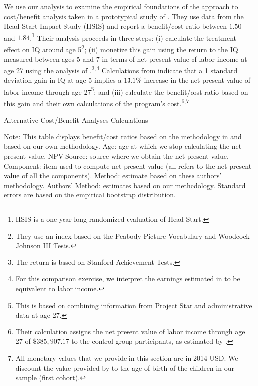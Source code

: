 We use our analysis to examine the empirical foundations of the approach to cost/benefit analysis taken in a prototypical study of \citet{Kline_Walters_2016_QJE}. They use data from the Head Start Impact Study (HSIS) and report a benefit/cost ratio between $1.50$ and $1.84$.\footnote{HSIS is a one-year-long randomized evaluation of Head Start.} Their analysis proceeds in three steps: (i) calculate the treatment effect on IQ around age 5\footnote{They use an index based on the Peabody Picture Vocabulary and Woodcock Johnson III Tests.}; (ii) monetize this gain using the return to the IQ measured between ages 5 and 7 in terms of net present value of labor income at age 27 using the analysis of \citet{Chetty_Friedman_etal_2011_QJoE}.\footnote{The \citet{Chetty_Friedman_etal_2011_QJoE} return is based on Stanford Achievement Tests.}$^,$\footnote{For this comparison exercise, we interpret the earnings estimated in \citet{Chetty_Friedman_etal_2011_QJoE} to be equivalent to labor income.} Calculations from \citet{Chetty_Friedman_etal_2011_QJoE} indicate that a 1 standard deviation gain in IQ at age 5 implies a $13.1\%$ increase in the net present value of labor income through age 27\footnote{This is based on combining information from Project Star and administrative data at age 27.}; and (iii) calculate the benefit/cost ratio based on this gain and their own calculations of the program's cost.\footnote{Their calculation assigns the net present value of labor income through age 27 of $\$385,907.17$ to the control-group participants, as estimated by  \citet{Chetty_Friedman_etal_2011_QJoE}.}$^,$\footnote{All monetary values that we provide in this section are in 2014 USD. We discount the value provided by \citet{Chetty_Friedman_etal_2011_QJoE} to the age of birth of the children in our sample (first cohort).}

\begin{table}[!htbp]
\begin{threeparttable}
\caption{Alternative Cost/Benefit Analyses Calculations}
\label{table:comparing}
\centering
\footnotesize

\begin{tablenotes}
\footnotesize
\item Note: This table displays benefit/cost ratios based on the methodology in \citet{Kline_Walters_2016_QJE} and based on our own methodology. Age: age at which we stop calculating the net present value. NPV Source: source where we obtain the net present value. Component: item used to compute net present value (all refers to the net present value of all the components). \citet{Kline_Walters_2016_QJE} Method: estimate based on these authors' methodology. Authors' Method: estimates based on our methodology. Standard errors are based on the empirical bootstrap distribution.
\end{tablenotes}
\end{threeparttable}
\end{table}

